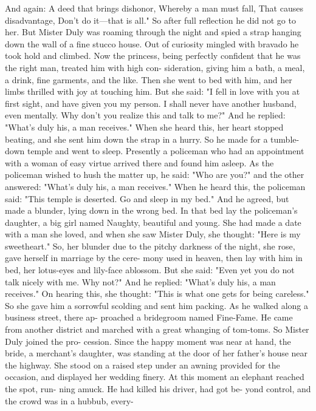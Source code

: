 \documentclass{book}
\begin{document}
And again:
A deed that brings dishonor,
Whereby a man must fall,
That causes disadvantage,
Don't do it---that is all."
So after full reflection he did not go to her. But
Mister Duly was roaming through the night and spied
a strap hanging down the wall of a fine stucco house.
Out of curiosity mingled with bravado he took hold
and climbed.
Now the princess, being perfectly confident that
he was the right man, treated him with high con-
sideration, giving him a bath, a meal, a drink, fine
garments, and the like. Then she went to bed with
him, and her limbs thrilled with joy at touching him.
But she said: "I fell in love with you at first sight,
and have given you my person. I shall never have
another husband, even mentally. Why don't you
realize this and talk to me?" And he replied:
"What's duly his, a man receives."
When she heard this, her heart stopped beating,
and she sent him down the strap in a hurry. So he
made for a tumble-down temple and went to sleep.
Presently a policeman who had an appointment with
a woman of easy virtue arrived there and found him
asleep. As the policeman wished to hush the matter
up, he said: "Who are you?" and the other answered:
"What's duly his, a man receives."
When he heard this, the policeman said: "This
temple is deserted. Go and sleep in my bed." And he
agreed, but made a blunder, lying down in the wrong
bed. In that bed lay the policeman's daughter, a big
girl named Naughty, beautiful and young. She had
made a date with a man she loved, and when she saw
Mister Duly, she thought: "Here is my sweetheart."
So, her blunder due to the pitchy darkness of the
night, she rose, gave herself in marriage by the cere-
mony used in heaven, then lay with him in bed, her
lotus-eyes and lily-face ablossom. But she said:
"Even yet you do not talk nicely with me. Why
not?" And he replied:
"What's duly his, a man receives."
On hearing this, she thought: "This is what one
gets for being careless." So she gave him a sorrowful
scolding and sent him packing.
As he walked along a business street, there ap-
proached a bridegroom named Fine-Fame. He came
from another district and marched with a great
whanging of tom-toms. So Mister Duly joined the pro-
cession. Since the happy moment was near at hand,
the bride, a merchant's daughter, was standing at the
door of her father's house near the highway. She
stood on a raised step under an awning provided for
the occasion, and displayed her wedding finery.
At this moment an elephant reached the spot, run-
ning amuck. He had killed his driver, had got be-
yond control, and the crowd was in a hubbub, every-
\end{document}
